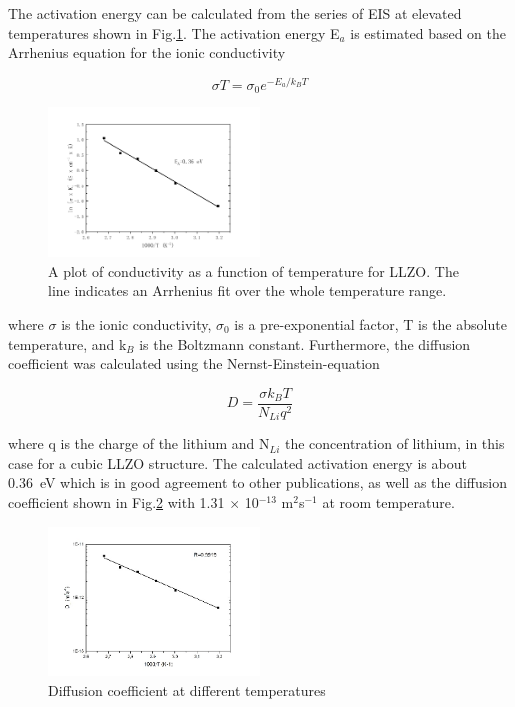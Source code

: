 \documentclass[twoside,twocolumn,9pt]{article}
\begin{document}
The activation energy can be calculated from the series of EIS at elevated temperatures shown in Fig.\ref{fig:arrhenius-plot}.
The activation energy E$_a$ is estimated based on the Arrhenius equation for the ionic conductivity

\begin{equation}
\sigma T = \sigma_0 e^{-E_a/k_B T}
\end{equation}


\begin{figure}[t]
\centering
\includegraphics[width=0.5\textwidth]{Pics/arrhenius-plot.png}
\caption{A plot of conductivity as a function of temperature for LLZO. The line indicates an Arrhenius fit over the whole temperature range.}
\label{fig:arrhenius-plot}
\end{figure}

where $\sigma$ is the ionic conductivity, $\sigma_0$ is a pre-exponential factor, T is the absolute temperature, and k$_B$ is the Boltzmann constant.
Furthermore, the diffusion coefficient was calculated using the Nernst-Einstein-equation

\begin{equation}
D=\frac{\sigma k_B T}{N_{Li} q^2}
\end{equation}

where q is the charge of the lithium and N$_{Li}$ the concentration of lithium, in this case for a cubic LLZO structure.
The calculated activation energy is about 0.36~eV which is in good agreement to other publications,
as well as the diffusion coefficient shown in Fig.\ref{fig:DiffusionCoefficient} with 1.31 $\times$ 10$^{-13}$ m$^2$s$^{-1}$ at room temperature.



\begin{figure}[t]
\centering
\includegraphics[width=0.5\textwidth]{Pics/DiffusionCoefficient.png}
\caption{Diffusion coefficient at different temperatures}
\label{fig:DiffusionCoefficient}
\end{figure}
\end{document}

